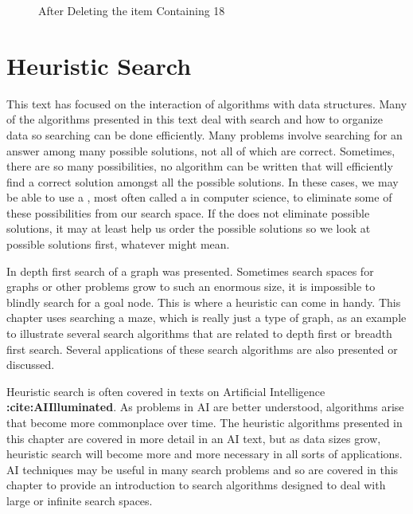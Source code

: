 \documentclass[letterpaper,10pt,english]{sphinxmanual}
\begin{document}
\begin{figure}[htbp]
\centering
\capstart

\noindent{}
\caption{After Deleting the item Containing 18}\label{\detokenize{chap10/chap10:id16}}\end{figure}


\chapter{Heuristic Search}
\label{\detokenize{chap12/chap12:heuristic-search}}\label{\detokenize{chap12/chap12:chap12}}\label{\detokenize{chap12/chap12::doc}}
This text has focused on the interaction of algorithms with data structures. Many of the algorithms presented in this text deal with search and how to organize data so searching can be done efficiently. Many problems involve searching for an answer among many possible solutions, not all of which are correct. Sometimes, there are so many possibilities, no algorithm can be written that will efficiently find a correct solution amongst all the possible solutions. In these cases, we may be able to use a , most often called a  in computer science, to eliminate some of these possibilities from our search space. If the  does not eliminate possible solutions, it may at least help us order the possible solutions so we look at  possible solutions first, whatever  might mean.

In {\hyperref[\detokenize{chap7/chap7:graphchap}]{}} depth first search of a graph was presented. Sometimes search spaces for graphs or other problems grow to such an enormous size, it is impossible to blindly search for a goal node. This is where a heuristic can come in handy. This chapter uses searching a maze, which is really just a type of graph, as an example to illustrate several search algorithms that are related to depth first or breadth first search. Several applications of these search algorithms are also presented or discussed.

Heuristic search is often covered in texts on Artificial Intelligence {\color{red}\bfseries{}:cite:\textasciigrave{}AIIlluminated\textasciigrave{}}. As problems in AI are better understood, algorithms arise that become more commonplace over time. The heuristic algorithms presented in this chapter are covered in more detail in an AI text, but as data sizes grow, heuristic search will become more and more necessary in all sorts of applications. AI techniques may be useful in many search problems and so are covered in this chapter to provide an introduction to search algorithms designed to deal with large or infinite search spaces.
\end{document}
